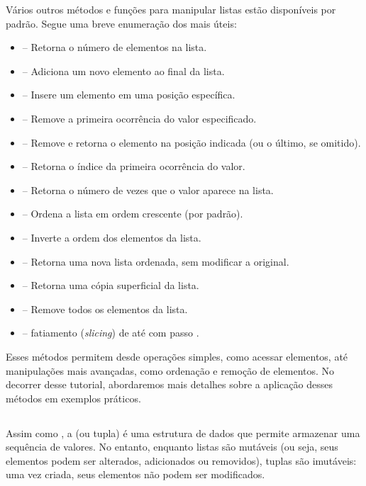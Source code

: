 Vários outros métodos e funções para manipular listas estão disponíveis por padrão. Segue uma breve enumeração dos mais úteis:
\begin{itemize}
\item {} – Retorna o número de elementos na lista.
\item {} -- Adiciona um novo elemento ao final da lista.
\item {} -- Insere um elemento em uma posição específica.
\item {} -- Remove a primeira ocorrência do valor especificado.
\item {} -- Remove e retorna o elemento na posição indicada (ou o último, se omitido).
\item {} -- Retorna o índice da primeira ocorrência do valor.
\item {} -- Retorna o número de vezes que o valor aparece na lista.
\item {} – Ordena a lista em ordem crescente (por padrão).
\item {} -- Inverte a ordem dos elementos da lista.
\item {} -- Retorna uma nova lista ordenada, sem modificar a original.
\item {} -- Retorna uma cópia superficial da lista.
\item {} -- Remove todos os elementos da lista.
\item {} -- fatiamento (\emph{slicing}) de  até  com passo .
\end{itemize}

Esses métodos permitem desde operações simples, como acessar elementos, até manipulações mais avançadas,
como ordenação e remoção de elementos.
No decorrer desse tutorial, abordaremos mais detalhes sobre a aplicação desses métodos em exemplos práticos.


\subsection{}

Assim como , a  (ou tupla) é uma estrutura de dados que permite armazenar uma sequência
de valores.
No entanto, enquanto listas são mutáveis (ou seja, seus elementos podem ser alterados, adicionados ou removidos),
tuplas são imutáveis: uma vez criada, seus elementos não podem ser modificados.

